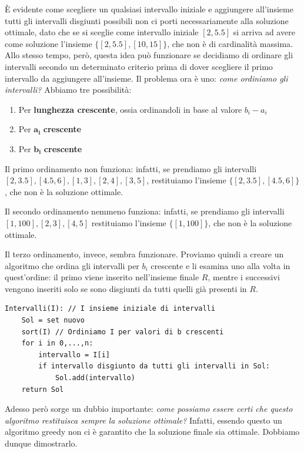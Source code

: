 \documentclass[11pt, a4paper, titlepage, oneside]{scrbook}
\begin{document}
È evidente come scegliere un qualsiasi intervallo iniziale e aggiungere all'insieme tutti gli intervalli disgiunti possibili non ci porti necessariamente alla soluzione ottimale, dato che se si sceglie come intervallo iniziale $[2,5.5]$ si arriva ad avere come soluzione l'insieme $\{[2,5.5], [10,15]\}$, che non è di cardinalità massima. Allo stesso tempo, però, questa idea può funzionare se decidiamo di ordinare gli intervalli secondo un determinato criterio prima di dover scegliere il primo intervallo da aggiungere all'insieme. Il problema ora è uno: \textit{come ordiniamo gli intervalli?} Abbiamo tre possibilità:
\begin{enumerate}
    \item Per \textbf{lunghezza crescente}, ossia ordinandoli in base al valore $b_i - a_i$
    \item Per $\bm{a_i}$ \textbf{crescente}
    \item Per $\bm{b_i}$ \textbf{crescente}
\end{enumerate}

Il primo ordinamento non funziona: infatti, se prendiamo gli intervalli $[2,3.5], [4.5,6], [1,3], [2,4], [3,5]$, restituiamo l'insieme $\{[2,3.5], [4.5,6]\}$, che non è la soluzione ottimale.

Il secondo ordinamento nemmeno funziona: infatti, se prendiamo gli intervalli $[1,100], [2,3], [4,5]$ restituiamo l'insieme $\{[1,100]\}$, che non è la soluzione ottimale.

Il terzo ordinamento, invece, sembra funzionare. Proviamo quindi a creare un algoritmo che ordina gli intervalli per $b_i$ crescente e li esamina uno alla volta in quest'ordine: il primo viene inserito nell'insieme finale $R$, mentre i successivi vengono inseriti solo se sono disgiunti da tutti quelli  già presenti in $R$.

\begin{lstlisting}
Intervalli(I): // I insieme iniziale di intervalli
    Sol = set nuovo
    sort(I) // Ordiniamo I per valori di b crescenti
    for i in 0,...,n:
        intervallo = I[i]
        if intervallo disgiunto da tutti gli intervalli in Sol:
            Sol.add(intervallo)
    return Sol
\end{lstlisting}

Adesso però sorge un dubbio importante: \textit{come possiamo essere certi che questo algoritmo restituisca sempre la soluzione ottimale?} Infatti, essendo questo un algoritmo greedy non ci è garantito che la soluzione finale sia ottimale. Dobbiamo dunque dimostrarlo.
\end{document}
